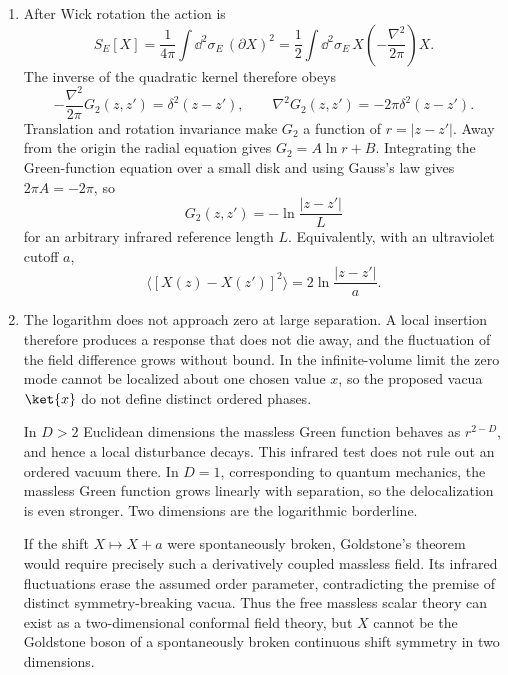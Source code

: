 \begin{enumerate}
  \begin{enumerate}
    \item[(a)] After Wick rotation the action is
    \[
      S_E[X]=\frac{1}{4\pi}\int \dd^2\sigma_E\,(\partial X)^2
      =\frac12\int \dd^2\sigma_E\,
      X\left(-\frac{\nabla^2}{2\pi}\right)X .
    \]
    The inverse of the quadratic kernel therefore obeys
    \[
      -\frac{\nabla^2}{2\pi}G_2(z,z')=\delta^2(z-z'),
      \qquad
      \nabla^2G_2(z,z')=-2\pi\delta^2(z-z').
    \]
    Translation and rotation invariance make \(G_2\) a function of
    \(r=|z-z'|\).  Away from the origin the radial equation gives
    \(G_2=A\ln r+B\).  Integrating the Green-function equation over a small
    disk and using Gauss's law gives \(2\pi A=-2\pi\), so
    \[
      \boxed{G_2(z,z')=-\ln\frac{|z-z'|}{L}}
    \]
    for an arbitrary infrared reference length \(L\).  Equivalently, with
    an ultraviolet cutoff \(a\),
    \[
      \big\langle [X(z)-X(z')]^2\big\rangle
      =2\ln\frac{|z-z'|}{a}.
    \]

    \item[(b)] The logarithm does not approach zero at large separation.  A local
    insertion therefore produces a response that does not die away, and the
    fluctuation of the field difference grows without bound.  In the
    infinite-volume limit the zero mode cannot be localized about one
    chosen value \(x\), so the proposed vacua \(\ket{x}\) do not
    define distinct ordered phases.

    In \(D>2\) Euclidean dimensions the massless Green function behaves as
    \(r^{2-D}\), and hence a local disturbance decays.  This infrared test
    does not rule out an ordered vacuum there.  In \(D=1\), corresponding to
    quantum mechanics, the massless Green function grows linearly with
    separation, so the delocalization is even stronger.  Two dimensions are
    the logarithmic borderline.

    If the shift \(X\mapsto X+a\) were spontaneously broken, Goldstone's
    theorem would require precisely such a derivatively coupled massless
    field.  Its infrared fluctuations erase the assumed order parameter,
    contradicting the premise of distinct symmetry-breaking vacua.  Thus the
    free massless scalar theory can exist as a two-dimensional conformal
    field theory, but \(X\) cannot be the Goldstone boson of a spontaneously
    broken continuous shift symmetry in two dimensions.
  \end{enumerate}

\end{enumerate}
